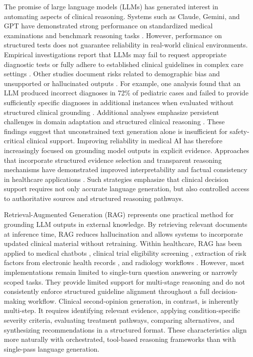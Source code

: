\documentclass[preprint,12pt]{elsarticle}
\begin{document}
The promise of large language models (LLMs) has generated interest in automating aspects of clinical reasoning. Systems such as Claude, Gemini, and GPT have demonstrated strong performance on standardized medical examinations and benchmark reasoning tasks \cite{r15,r16}. However, performance on structured tests does not guarantee reliability in real-world clinical environments. Empirical investigations report that LLMs may fail to request appropriate diagnostic tests or fully adhere to established clinical guidelines in complex care settings \cite{r27,r32}. Other studies document risks related to demographic bias and unsupported or hallucinated outputs \cite{r28,r30,r31}. For example, one analysis found that an LLM produced incorrect diagnoses in 72\% of pediatric cases and failed to provide sufficiently specific diagnoses in additional instances when evaluated without structured clinical grounding \cite{r29}. Additional analyses emphasize persistent challenges in domain adaptation and structured clinical reasoning \cite{r33,rodrigues2025}. These findings suggest that unconstrained text generation alone is insufficient for safety-critical clinical support. Improving reliability in medical AI has therefore increasingly focused on grounding model outputs in explicit evidence. Approaches that incorporate structured evidence selection and transparent reasoning mechanisms have demonstrated improved interpretability and factual consistency in healthcare applications \cite{emin2025}. Such strategies emphasize that clinical decision support requires not only accurate language generation, but also controlled access to authoritative sources and structured reasoning pathways.

Retrieval-Augmented Generation (RAG) represents one practical method for grounding LLM outputs in external knowledge. By retrieving relevant documents at inference time, RAG reduces hallucination and allows systems to incorporate updated clinical material without retraining. Within healthcare, RAG has been applied to medical chatbots \cite{r16}, clinical trial eligibility screening \cite{r18}, extraction of risk factors from electronic health records \cite{r17}, and radiology workflows \cite{r39}. However, most implementations remain limited to single-turn question answering or narrowly scoped tasks. They provide limited support for multi-stage reasoning and do not consistently enforce structured guideline alignment throughout a full decision-making workflow. Clinical second-opinion generation, in contrast, is inherently multi-step. It requires identifying relevant evidence, applying condition-specific severity criteria, evaluating treatment pathways, comparing alternatives, and synthesizing recommendations in a structured format. These characteristics align more naturally with orchestrated, tool-based reasoning frameworks than with single-pass language generation.
\end{document}
